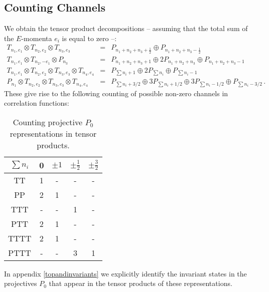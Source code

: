 \documentclass[12pt]{article}
\numberwithin{equation}{section}
\numberwithin{equation}{section}
\numberwithin{table}{section}\setlength{\multlinegap}{25pt}
\begin{document}
\subsection{Counting Channels}
\label{channels}
We obtain the tensor product decompositions --  assuming that the total sum of the $E$-momenta $e_i$ is
equal to zero --:
\begin{eqnarray}
T_{n_1,e_1} \otimes T_{n_2,e_2} \otimes T_{n_3,e_3} & = &
P_{n_1+n_2+n_3+\frac{1}{2}} \oplus P_{n_1+n_2+n_3-\frac{1}{2}}
\nonumber \\
T_{n_1,e_1} \otimes T_{n_2,-e_1} \otimes P_{n_3} &=&
P_{n_1+n_2+n_3+1} \oplus 2 P_{n_1+n_2+n_3} \oplus P_{n_1+n_2+n_3-1} 
\nonumber \\
T_{n_1,e_1} \otimes T_{n_2,e_2} \otimes T_{n_3,e_3} \otimes T_{n_4,e_4} & = &
P_{\sum n_i +1} \oplus 2 P_{\sum n_i}  \oplus  P_{\sum n_i-1} 
\nonumber \\
P_{n_1}  \otimes T_{n_2,e_2} \otimes T_{n_3,e_3} \otimes T_{n_4,e_4}
 &=& 
P_{\sum n_i +3/2} \oplus 3 P_{\sum n_i+1/2}  \oplus 3 P_{\sum n_i-1/2} \oplus  P_{\sum n_i-3/2} \, .
\nonumber 
\end{eqnarray}
These give rise to the following counting of possible non-zero channels in correlation functions:
\begin{table}[H]
\centering
\begin{tabular}{|c|c|c|c|c|}
\hline
$\sum n_i$   & 0 & $\pm 1$ & $ \pm \frac{1}{2}$ & $ \pm \frac{3}{2}$
\\ 
\hline 
TT & 1 & - & - & - \\
PP & 2 & 1 & - & - \\
TTT & - & - & 1 & - \\
PTT & 2 & 1 & - & - \\
TTTT & 2 & 1 & - & - \\
PTTT & - & - & 3 & 1 \\
\hline
\end{tabular}
\caption{Counting projective $P_0$ representations in tensor products.}
\label{countingPzeroes}
\end{table}
\noindent
In appendix \ref{topandinvariants} we explicitly identify the invariant states in the projectives $P_0$
that appear in the tensor products of these representations. 
\end{document}
